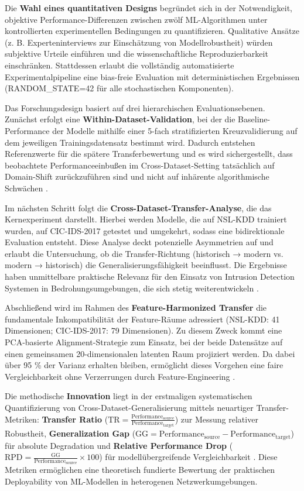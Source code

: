 \documentclass[11pt,a4paper]{article}
\begin{document}
    Die \textbf{Wahl eines quantitativen Designs} begründet sich in der Notwendigkeit, objektive Performance-Differenzen zwischen zwölf ML-Algorithmen unter kontrollierten experimentellen Bedingungen zu quantifizieren. Qualitative Ansätze (z. B. Experteninterviews zur Einschätzung von Modellrobustheit) würden subjektive Urteile einführen und die wissenschaftliche Reproduzierbarkeit einschränken. Stattdessen erlaubt die vollständig automatisierte Experimentalpipeline eine bias-freie Evaluation mit deterministischen Ergebnissen (RANDOM\_STATE=42 für alle stochastischen Komponenten).

    Das Forschungsdesign basiert auf drei hierarchischen Evaluationsebenen. Zunächst erfolgt eine \textbf{Within-Dataset-Validation}, bei der die Baseline-Performance der Modelle mithilfe einer 5-fach stratifizierten Kreuzvalidierung auf dem jeweiligen Trainingsdatensatz bestimmt wird. Dadurch entstehen Referenzwerte für die spätere Transferbewertung und es wird sichergestellt, dass beobachtete Performanceeinbußen im Cross-Dataset-Setting tatsächlich auf Domain-Shift zurückzuführen sind und nicht auf inhärente algorithmische Schwächen \parencite{Tavallaee2009}.

    Im nächsten Schritt folgt die \textbf{Cross-Dataset-Transfer-Analyse}, die das Kernexperiment darstellt. Hierbei werden Modelle, die auf NSL-KDD trainiert wurden, auf CIC-IDS-2017 getestet und umgekehrt, sodass eine bidirektionale Evaluation entsteht. Diese Analyse deckt potenzielle Asymmetrien auf und erlaubt die Untersuchung, ob die Transfer-Richtung (historisch → modern vs. modern → historisch) die Generalisierungsfähigkeit beeinflusst. Die Ergebnisse haben unmittelbare praktische Relevanz für den Einsatz von Intrusion Detection Systemen in Bedrohungsumgebungen, die sich stetig weiterentwickeln \parencite{Ring2019}.

    Abschließend wird im Rahmen des \textbf{Feature-Harmonized Transfer} die fundamentale Inkompatibilität der Feature-Räume adressiert (NSL-KDD: 41 Dimensionen; CIC-IDS-2017: 79 Dimensionen). Zu diesem Zweck kommt eine PCA-basierte Alignment-Strategie zum Einsatz, bei der beide Datensätze auf einen gemeinsamen 20-dimensionalen latenten Raum projiziert werden. Da dabei über 95 \% der Varianz erhalten bleiben, ermöglicht dieses Vorgehen eine faire Vergleichbarkeit ohne Verzerrungen durch Feature-Engineering \parencite{Goodfellow2016}.

    Die methodische \textbf{Innovation} liegt in der erstmaligen systematischen Quantifizierung von Cross-Dataset-Generalisierung mittels neuartiger Transfer-Metriken: \textbf{Transfer Ratio} ($\text{TR} = \frac{\text{Performance}_{\text{source}}}{\text{Performance}_{\text{target}}}$) zur Messung relativer Robustheit, \textbf{Generalization Gap} ($\text{GG} = \text{Performance}_{\text{source}} - \text{Performance}_{\text{target}}$) für absolute Degradation und \textbf{Relative Performance Drop} ($\text{RPD} = \frac{\text{GG}}{\text{Performance}_{\text{source}}} \times 100$) für modellübergreifende Vergleichbarkeit \parencite{Mourouzis2021}. Diese Metriken ermöglichen eine theoretisch fundierte Bewertung der praktischen Deployability von ML-Modellen in heterogenen Netzwerkumgebungen.
\end{document}
